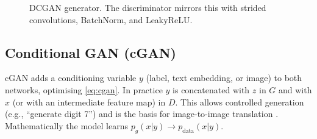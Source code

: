 \documentclass[conference]{IEEEtran}
\newcommand{\pdata}{p_{\mathrm{data}}}
\newcommand{\pg}{p_{g}}
\theoremstyle{plain}
\theoremstyle{definition}
\begin{document}
\begin{figure}[t]
\centering
{}
\caption{DCGAN generator. The discriminator mirrors this with strided convolutions, BatchNorm, and LeakyReLU.}
\label{fig:dcgan}
\end{figure}

\subsection{Conditional GAN (cGAN) \cite{mirza2014cgan}}
cGAN adds a conditioning variable $y$ (label, text embedding, or image) to both networks, optimising \eqref{eq:cgan}. In practice $y$ is concatenated with $z$ in $G$ and with $x$ (or with an intermediate feature map) in $D$. This allows controlled generation (e.g., ``generate digit 7'') and is the basis for image-to-image translation \cite{isola2017pix2pix}. Mathematically the model learns $\pg(x|y)\to\pdata(x|y)$.
\end{document}
